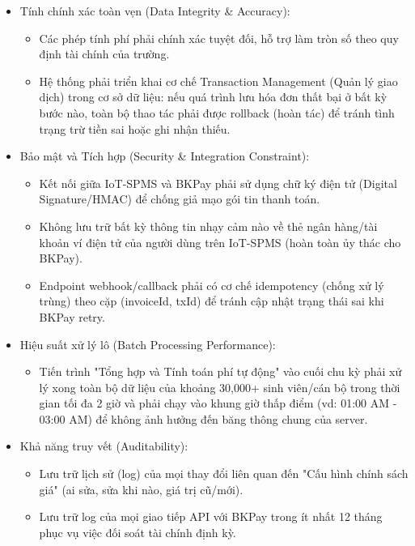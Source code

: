\begin{itemize}
    \item Tính chính xác toàn vẹn (Data Integrity \& Accuracy):
    \begin{itemize}
        \item Các phép tính phí phải chính xác tuyệt đối, hỗ trợ làm tròn số theo quy định tài chính của trường.
        \item Hệ thống phải triển khai cơ chế Transaction Management (Quản lý giao dịch) trong cơ sở dữ liệu: nếu quá trình lưu hóa đơn thất bại ở bất kỳ bước nào, toàn bộ thao tác phải được rollback (hoàn tác) để tránh tình trạng trừ tiền sai hoặc ghi nhận thiếu.
    \end{itemize}

    \item Bảo mật và Tích hợp (Security \& Integration Constraint):
    \begin{itemize}
        \item Kết nối giữa IoT-SPMS và BKPay phải sử dụng chữ ký điện tử (Digital Signature/HMAC) để chống giả mạo gói tin thanh toán.
        \item Không lưu trữ bất kỳ thông tin nhạy cảm nào về thẻ ngân hàng/tài khoản ví điện tử của người dùng trên IoT-SPMS (hoàn toàn ủy thác cho BKPay).
        \item Endpoint webhook/callback phải có cơ chế idempotency (chống xử lý trùng) theo cặp (invoiceId, txId) để tránh cập nhật trạng thái sai khi BKPay retry.
    \end{itemize}

    \item Hiệu suất xử lý lô (Batch Processing Performance):
    \begin{itemize}
        \item Tiến trình "Tổng hợp và Tính toán phí tự động" vào cuối chu kỳ phải xử lý xong toàn bộ dữ liệu của khoảng 30,000+ sinh viên/cán bộ trong thời gian tối đa 2 giờ và phải chạy vào khung giờ thấp điểm (vd: 01:00 AM - 03:00 AM) để không ảnh hưởng đến băng thông chung của server.
    \end{itemize}

    \item Khả năng truy vết (Auditability):
    \begin{itemize}
        \item Lưu trữ lịch sử (log) của mọi thay đổi liên quan đến "Cấu hình chính sách giá" (ai sửa, sửa khi nào, giá trị cũ/mới).
        \item Lưu trữ log của mọi giao tiếp API với BKPay trong ít nhất 12 tháng phục vụ việc đối soát tài chính định kỳ.
    \end{itemize}


\end{itemize}
